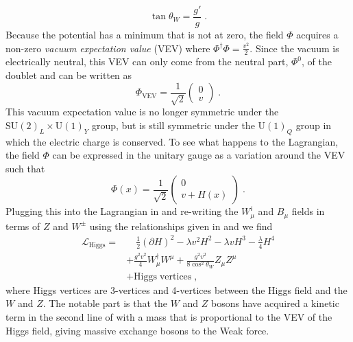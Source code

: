\begin{equation}
    \tan \theta_W = \frac{g'}{g}\;.\label{eq:weinberg-angle}
\end{equation}
Because the potential has a minimum that is not at zero, the field $\Phi$ acquires a non-zero \emph{vacuum expectation value} (VEV) where $\Phi^\dag \Phi = \frac{v^2}{2}$.
Since the vacuum is electrically neutral, this VEV can only come from the neutral part, $\Phi^0$, of the doublet and can be written as
\begin{equation}
    \Phi_\mathrm{VEV} = \frac{1}{\sqrt{2}}\begin{pmatrix}
        0\\
        v
    \end{pmatrix}\;.
\end{equation}
This vacuum expectation value is no longer symmetric under the $\mathrm{SU}(2)_L \times \mathrm{U}(1)_Y$ group, but is still symmetric under the $\mathrm{U}(1)_Q$ group in which the electric charge is conserved.
To see what happens to the Lagrangian, the field $\Phi$ can be expressed in the unitary gauge as a variation around the VEV such that
\begin{equation}
    \Phi(x) = \frac{1}{\sqrt{2}}\begin{pmatrix}
        0 \\
        v + H(x)
    \end{pmatrix}\;.
\end{equation}
Plugging this into the Lagrangian in  and re-writing the $W_\mu^i$ and $B_\mu$ fields in terms of $Z$ and $W^\pm$ using the relationships given in  and  we find
\begin{equation}
\begin{aligned}
    \mathcal{L}_\mathrm{Higgs} = &\hspace{1em}\frac{1}{2}(\partial H)^2 - \lambda v^2 H^2 - \lambda v H^3 - \frac{\lambda}{4}H^4 \\
    &+ \frac{g^2v^2}{4} W_\mu^\dag W^\mu + \frac{g^2 v^2}{8\cos^2\theta_W}Z_\mu Z^\mu \\
    &+ \mathrm{Higgs\;vertices}\;,
    \label{eq:boson-mass-terms}
\end{aligned}
\end{equation}
where Higgs vertices are 3-vertices and 4-vertices between the Higgs field and the $W$ and $Z$.
The notable part is that the $W$ and $Z$ bosons have acquired a kinetic term in the second line of  with a mass that is proportional to the VEV of the Higgs field, giving massive exchange bosons to the Weak force.

